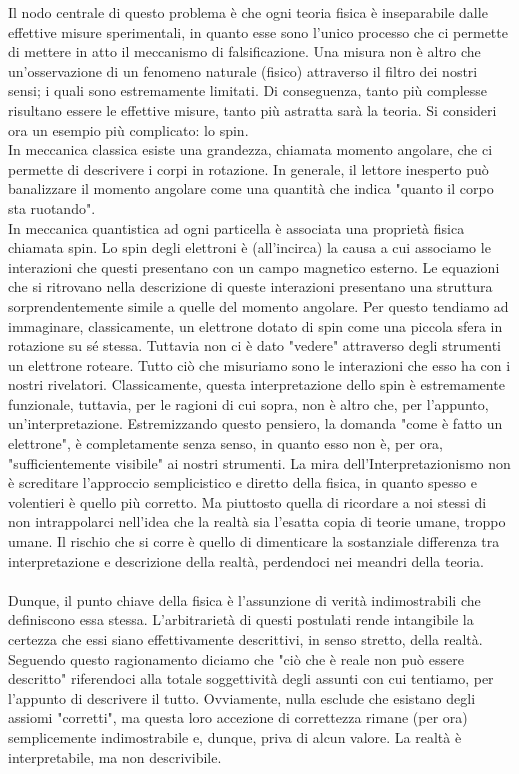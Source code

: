 \documentclass[]{scrbook}
\begin{document}
	Il nodo centrale di questo problema è che ogni teoria fisica è inseparabile dalle effettive misure sperimentali, in quanto esse sono l'unico processo che ci permette di mettere in atto il meccanismo di falsificazione. Una misura non è altro che un'osservazione di un fenomeno naturale (fisico) attraverso il filtro dei nostri sensi; i quali sono estremamente limitati. Di conseguenza, tanto più complesse risultano essere le effettive misure, tanto più astratta sarà la teoria. Si consideri ora un esempio più complicato: lo spin.\\
	In meccanica classica esiste una grandezza, chiamata momento angolare, che ci permette di descrivere i corpi in rotazione. In generale, il lettore inesperto può banalizzare il momento angolare come una quantità che indica "quanto il corpo sta ruotando".\\
	In meccanica quantistica ad ogni particella è associata una proprietà fisica chiamata spin. Lo spin degli elettroni è (all'incirca) la causa a cui associamo le interazioni che questi presentano con un campo magnetico esterno. Le equazioni che si ritrovano nella descrizione di queste interazioni presentano una struttura sorprendentemente simile a quelle del momento angolare. Per questo tendiamo ad immaginare, classicamente, un elettrone dotato di spin come una piccola sfera in rotazione su sé stessa. Tuttavia non ci è dato "vedere" attraverso degli strumenti un elettrone roteare. Tutto ciò che misuriamo sono le interazioni che esso ha con i nostri rivelatori. Classicamente, questa interpretazione dello spin è estremamente funzionale, tuttavia, per le ragioni di cui sopra, non è altro che, per l'appunto, un'interpretazione. Estremizzando questo pensiero, la domanda "come è fatto un elettrone", è completamente senza senso, in quanto esso non è, per ora, "sufficientemente visibile" ai nostri strumenti. La mira dell'Interpretazionismo non è screditare l'approccio semplicistico e diretto della fisica, in quanto spesso e volentieri è quello più corretto. Ma piuttosto quella di ricordare a noi stessi di non intrappolarci nell'idea che la realtà sia l'esatta copia di teorie umane, troppo umane.  
	Il rischio che si corre è quello di dimenticare la sostanziale differenza tra interpretazione e descrizione della realtà, perdendoci nei meandri della teoria.\\
	\\
	Dunque, il punto chiave della fisica è l'assunzione di verità indimostrabili che definiscono essa stessa. L'arbitrarietà di questi postulati rende intangibile la certezza che essi siano effettivamente descrittivi, in senso stretto, della realtà. Seguendo questo ragionamento diciamo che "ciò che è reale non può essere descritto" riferendoci alla totale soggettività degli assunti con cui tentiamo, per l'appunto di descrivere il tutto. Ovviamente, nulla esclude che esistano degli assiomi "corretti", ma questa loro accezione di correttezza rimane (per ora) semplicemente indimostrabile e, dunque, priva di alcun valore. La realtà è interpretabile, ma non descrivibile.
\end{document}
